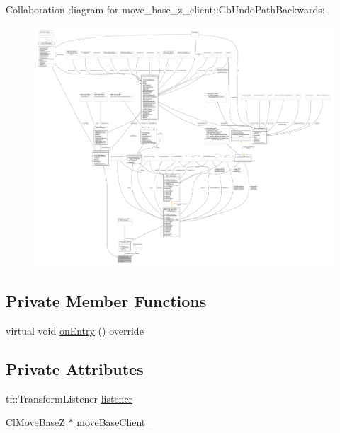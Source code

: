 Collaboration diagram for move\+\_\+base\+\_\+z\+\_\+client\+:\+:Cb\+Undo\+Path\+Backwards\+:
\nopagebreak
\begin{figure}[H]
\begin{center}
\leavevmode
\includegraphics[width=350pt]{classmove__base__z__client_1_1CbUndoPathBackwards__coll__graph}
\end{center}
\end{figure}
\subsection*{Private Member Functions}
\begin{DoxyCompactItemize}
\item 
virtual void \hyperlink{classmove__base__z__client_1_1CbUndoPathBackwards_a171b0d1a2943f5aca0647b101695eb71}{on\+Entry} () override
\end{DoxyCompactItemize}
\subsection*{Private Attributes}
\begin{DoxyCompactItemize}
\item 
tf\+::\+Transform\+Listener \hyperlink{classmove__base__z__client_1_1CbUndoPathBackwards_a197e2034e873c09de896e7a8b6fe898f}{listener}
\item 
\hyperlink{classmove__base__z__client_1_1ClMoveBaseZ}{Cl\+Move\+BaseZ} $\ast$ \hyperlink{classmove__base__z__client_1_1CbUndoPathBackwards_a19e7ace85698725a1d2730a7c6b3aa7d}{move\+Base\+Client\+\_\+}
\end{DoxyCompactItemize}
